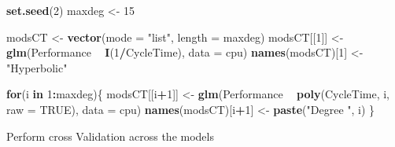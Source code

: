 \documentclass[12pt]{article}
\newenvironment{Shaded}{\begin{snugshade}}{\end{snugshade}}
\newcommand{\ControlFlowTok}[1]{\textcolor[rgb]{0.13,0.29,0.53}{\textbf{#1}}}
\newcommand{\DataTypeTok}[1]{\textcolor[rgb]{0.13,0.29,0.53}{#1}}
\newcommand{\DecValTok}[1]{\textcolor[rgb]{0.00,0.00,0.81}{#1}}
\newcommand{\KeywordTok}[1]{\textcolor[rgb]{0.13,0.29,0.53}{\textbf{#1}}}
\newcommand{\NormalTok}[1]{#1}
\newcommand{\OperatorTok}[1]{\textcolor[rgb]{0.81,0.36,0.00}{\textbf{#1}}}
\newcommand{\OtherTok}[1]{\textcolor[rgb]{0.56,0.35,0.01}{#1}}
\newcommand{\StringTok}[1]{\textcolor[rgb]{0.31,0.60,0.02}{#1}}
\begin{document}
\begin{Shaded}
\begin{Highlighting}[]
\KeywordTok{set.seed}\NormalTok{(}\DecValTok{2}\NormalTok{)}
\NormalTok{maxdeg <-}\StringTok{ }\DecValTok{15}

\NormalTok{modsCT <-}\StringTok{ }\KeywordTok{vector}\NormalTok{(}\DataTypeTok{mode =} \StringTok{"list"}\NormalTok{, }\DataTypeTok{length =}\NormalTok{ maxdeg)}
\NormalTok{modsCT[[}\DecValTok{1}\NormalTok{]] <-}\StringTok{ }\KeywordTok{glm}\NormalTok{(Performance }\OperatorTok{~}\StringTok{ }\KeywordTok{I}\NormalTok{(}\DecValTok{1}\OperatorTok{/}\NormalTok{CycleTime), }\DataTypeTok{data =}\NormalTok{ cpu)}
\KeywordTok{names}\NormalTok{(modsCT)[}\DecValTok{1}\NormalTok{] <-}\StringTok{ "Hyperbolic"}

\ControlFlowTok{for}\NormalTok{(i }\ControlFlowTok{in} \DecValTok{1}\OperatorTok{:}\NormalTok{maxdeg)\{}
\NormalTok{modsCT[[i}\OperatorTok{+}\DecValTok{1}\NormalTok{]] <-}\StringTok{  }\KeywordTok{glm}\NormalTok{(Performance }\OperatorTok{~}\StringTok{ }\KeywordTok{poly}\NormalTok{(CycleTime, i, }\DataTypeTok{raw =} \OtherTok{TRUE}\NormalTok{), }\DataTypeTok{data =}\NormalTok{ cpu)}
\KeywordTok{names}\NormalTok{(modsCT)[i}\OperatorTok{+}\DecValTok{1}\NormalTok{] <-}\StringTok{ }\KeywordTok{paste}\NormalTok{(}\StringTok{"Degree "}\NormalTok{, i)}
\NormalTok{\}}
\end{Highlighting}
\end{Shaded}

Perform cross Validation across the models

\begin{Shaded}
\end{Shaded}
\end{document}
